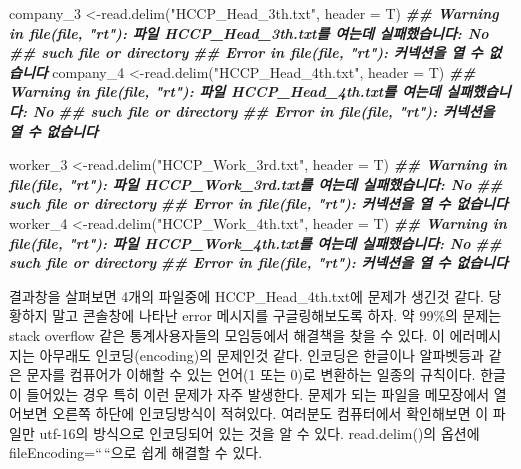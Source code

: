 \documentclass[
]{book}
\newenvironment{Shaded}{\begin{snugshade}}{\end{snugshade}}
\newcommand{\AttributeTok}[1]{\textcolor[rgb]{0.77,0.63,0.00}{#1}}
\newcommand{\DocumentationTok}[1]{\textcolor[rgb]{0.56,0.35,0.01}{\textbf{\textit{#1}}}}
\newcommand{\FunctionTok}[1]{\textcolor[rgb]{0.00,0.00,0.00}{#1}}
\newcommand{\NormalTok}[1]{#1}
\newcommand{\OtherTok}[1]{\textcolor[rgb]{0.56,0.35,0.01}{#1}}
\newcommand{\StringTok}[1]{\textcolor[rgb]{0.31,0.60,0.02}{#1}}
\theoremstyle{definition}
\theoremstyle{definition}
\theoremstyle{definition}
\theoremstyle{definition}
\theoremstyle{remark}
\begin{document}
\begin{Shaded}
\begin{Highlighting}[]
\NormalTok{company\_3 }\OtherTok{\textless{}{-}}\FunctionTok{read.delim}\NormalTok{(}\StringTok{"HCCP\_Head\_3th.txt"}\NormalTok{, }\AttributeTok{header =}\NormalTok{ T)}
\DocumentationTok{\#\# Warning in file(file, "rt"): 파일 \textquotesingle{}HCCP\_Head\_3th.txt\textquotesingle{}를 여는데 실패했습니다: No}
\DocumentationTok{\#\# such file or directory}
\DocumentationTok{\#\# Error in file(file, "rt"): 커넥션을 열 수 없습니다}
\NormalTok{company\_4 }\OtherTok{\textless{}{-}}\FunctionTok{read.delim}\NormalTok{(}\StringTok{"HCCP\_Head\_4th.txt"}\NormalTok{, }\AttributeTok{header =}\NormalTok{ T)}
\DocumentationTok{\#\# Warning in file(file, "rt"): 파일 \textquotesingle{}HCCP\_Head\_4th.txt\textquotesingle{}를 여는데 실패했습니다: No}
\DocumentationTok{\#\# such file or directory}
\DocumentationTok{\#\# Error in file(file, "rt"): 커넥션을 열 수 없습니다}

\NormalTok{worker\_3 }\OtherTok{\textless{}{-}}\FunctionTok{read.delim}\NormalTok{(}\StringTok{"HCCP\_Work\_3rd.txt"}\NormalTok{, }\AttributeTok{header =}\NormalTok{ T)}
\DocumentationTok{\#\# Warning in file(file, "rt"): 파일 \textquotesingle{}HCCP\_Work\_3rd.txt\textquotesingle{}를 여는데 실패했습니다: No}
\DocumentationTok{\#\# such file or directory}
\DocumentationTok{\#\# Error in file(file, "rt"): 커넥션을 열 수 없습니다}
\NormalTok{worker\_4 }\OtherTok{\textless{}{-}}\FunctionTok{read.delim}\NormalTok{(}\StringTok{"HCCP\_Work\_4th.txt"}\NormalTok{, }\AttributeTok{header =}\NormalTok{ T)}
\DocumentationTok{\#\# Warning in file(file, "rt"): 파일 \textquotesingle{}HCCP\_Work\_4th.txt\textquotesingle{}를 여는데 실패했습니다: No}
\DocumentationTok{\#\# such file or directory}
\DocumentationTok{\#\# Error in file(file, "rt"): 커넥션을 열 수 없습니다}
\end{Highlighting}
\end{Shaded}

결과창을 살펴보면 4개의 파일중에 HCCP\_Head\_4th.txt에 문제가 생긴것 같다. 당황하지 말고 콘솔창에 나타난 error 메시지를 구글링해보도록 하자. 약 99\%의 문제는 stack overflow 같은 통계사용자들의 모임등에서 해결책을 찾을 수 있다. 이 에러메시지는 아무래도 인코딩(encoding)의 문제인것 같다. 인코딩은 한글이나 알파벳등과 같은 문자를 컴퓨어가 이해할 수 있는 언어(1 또는 0)로 변환하는 일종의 규칙이다. 한글이 들어있는 경우 특히 이런 문제가 자주 발생한다. 문제가 되는 파일을 메모장에서 열어보면 오른쪽 하단에 인코딩방식이 적혀있다. 여러분도 컴퓨터에서 확인해보면 이 파일만 utf-16의 방식으로 인코딩되어 있는 것을 알 수 있다. read.delim()의 옵션에 fileEncoding=``\,``으로 쉽게 해결할 수 있다.
\end{document}
